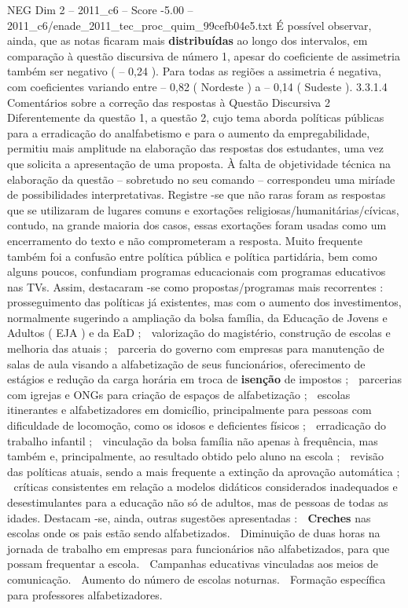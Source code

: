 \begin{textsample}{NEG Dim 2 – 2011\_c6 – Score -5.00 – 2011\_c6/enade\_2011\_tec\_proc\_quim\_99cefb04e5.txt}
É possível observar, ainda, que as notas ficaram mais \textbf{distribuídas} ao longo dos intervalos, em comparação à questão discursiva de número 1, apesar do coeficiente de assimetria também ser negativo ( – 0,24 ).
Para todas as regiões a assimetria é negativa, com coeficientes variando entre – 0,82 ( Nordeste ) a – 0,14 ( Sudeste ). 3.3.1.4 Comentários sobre a correção das respostas à Questão Discursiva 2 Diferentemente da questão 1, a questão 2, cujo tema aborda políticas públicas para a erradicação do analfabetismo e para o aumento da empregabilidade, permitiu mais amplitude na elaboração das respostas dos estudantes, uma vez que solicita a apresentação de uma proposta.
À falta de objetividade técnica na elaboração da questão – sobretudo no seu comando – correspondeu uma miríade de possibilidades interpretativas.
Registre -se que não raras foram as respostas que se utilizaram de lugares comuns e exortações religiosas/humanitárias/cívicas, contudo, na grande maioria dos casos, essas exortações foram usadas como um encerramento do texto e não comprometeram a resposta.
Muito frequente também foi a confusão entre política pública e política partidária, bem como alguns poucos, confundiam programas educacionais com programas educativos nas TVs.
Assim, destacaram -se como propostas/programas mais recorrentes :  prosseguimento das políticas já existentes, mas com o aumento dos investimentos, normalmente sugerindo a ampliação da bolsa família, da Educação de Jovens e Adultos ( EJA ) e da EaD ;  valorização do magistério, construção de escolas e melhoria das atuais ;  parceria do governo com empresas para manutenção de salas de aula visando a alfabetização de seus funcionários, oferecimento de estágios e redução da carga horária em troca de \textbf{isenção} de impostos ;  parcerias com igrejas e ONGs para criação de espaços de alfabetização ;  escolas itinerantes e alfabetizadores em domicílio, principalmente para pessoas com dificuldade de locomoção, como os idosos e deficientes físicos ;  erradicação do trabalho infantil ;  vinculação da bolsa família não apenas à frequência, mas também e, principalmente, ao resultado obtido pelo aluno na escola ;  revisão das políticas atuais, sendo a mais frequente a extinção da aprovação automática ;  críticas consistentes em relação a modelos didáticos considerados inadequados e desestimulantes para a educação não só de adultos, mas de pessoas de todas as idades.
Destacam -se, ainda, outras sugestões apresentadas :  \textbf{Creches} nas escolas onde os pais estão sendo alfabetizados.  Diminuição de duas horas na jornada de trabalho em empresas para funcionários não alfabetizados, para que possam frequentar a escola.  Campanhas educativas vinculadas aos meios de comunicação.  Aumento do número de escolas noturnas.  Formação específica para professores alfabetizadores.

\end{textsample}
